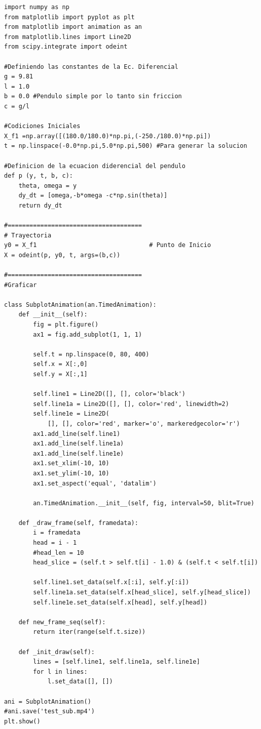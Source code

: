 \documentclass[12pt,letterpaper]{article}
\begin{document}
\begin{verbatim}
import numpy as np
from matplotlib import pyplot as plt
from matplotlib import animation as an
from matplotlib.lines import Line2D
from scipy.integrate import odeint

#Definiendo las constantes de la Ec. Diferencial
g = 9.81
l = 1.0
b = 0.0 #Pendulo simple por lo tanto sin friccion
c = g/l

#Codiciones Iniciales
X_f1 =np.array([(180.0/180.0)*np.pi,(-250./180.0)*np.pi])
t = np.linspace(-0.0*np.pi,5.0*np.pi,500) #Para generar la solucion

#Definicion de la ecuacion diderencial del pendulo
def p (y, t, b, c):
    theta, omega = y
    dy_dt = [omega,-b*omega -c*np.sin(theta)]
    return dy_dt

#=====================================
# Trayectoria
y0 = X_f1                               # Punto de Inicio   
X = odeint(p, y0, t, args=(b,c))         

#=====================================
#Graficar

class SubplotAnimation(an.TimedAnimation):
    def __init__(self):
        fig = plt.figure()
        ax1 = fig.add_subplot(1, 1, 1)
       
        self.t = np.linspace(0, 80, 400)
        self.x = X[:,0]
        self.y = X[:,1]

        self.line1 = Line2D([], [], color='black')
        self.line1a = Line2D([], [], color='red', linewidth=2)
        self.line1e = Line2D(
            [], [], color='red', marker='o', markeredgecolor='r')
        ax1.add_line(self.line1)
        ax1.add_line(self.line1a)
        ax1.add_line(self.line1e)
        ax1.set_xlim(-10, 10)
        ax1.set_ylim(-10, 10)
        ax1.set_aspect('equal', 'datalim')

        an.TimedAnimation.__init__(self, fig, interval=50, blit=True)

    def _draw_frame(self, framedata):
        i = framedata
        head = i - 1
        #head_len = 10
        head_slice = (self.t > self.t[i] - 1.0) & (self.t < self.t[i])

        self.line1.set_data(self.x[:i], self.y[:i])
        self.line1a.set_data(self.x[head_slice], self.y[head_slice])
        self.line1e.set_data(self.x[head], self.y[head])

    def new_frame_seq(self):
        return iter(range(self.t.size))

    def _init_draw(self):
        lines = [self.line1, self.line1a, self.line1e]
        for l in lines:
            l.set_data([], [])

ani = SubplotAnimation()
#ani.save('test_sub.mp4')
plt.show()
\end{verbatim}
\end{document}
